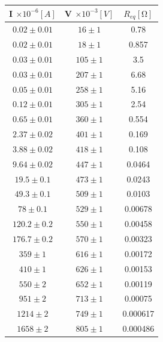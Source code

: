 \documentclass[a4paper]{article}
\begin{document}
\begin{center}
\begin{tabular}{|c|c|c|}
\hline
I $\times 10^{-6}[A]$ & V $\times 10^{-3}[V]$ & $R_{eq} [\si{\ohm}]$\\
\hline
$0.02 \pm 0.01$ & $16 \pm 1$ & 0.78 \\
$0.02 \pm 0.01$ & $18 \pm 1$ & 0.857 \\
$0.03 \pm 0.01$ & $105 \pm 1$ & 3.5 \\
$0.03 \pm 0.01$ & $207 \pm 1$ & 6.68 \\
$0.05 \pm 0.01$ & $258 \pm 1$ & 5.16 \\
$0.12 \pm 0.01$ & $305 \pm 1$ & 2.54 \\
$0.65 \pm 0.01$ & $360 \pm 1$ & 0.554 \\
$2.37 \pm 0.02$ & $401 \pm 1$ & 0.169 \\
$3.88 \pm 0.02$ & $418 \pm 1$ & 0.108 \\
$9.64 \pm 0.02$ & $447 \pm 1$ & 0.0464 \\
$19.5 \pm 0.1$ & $473 \pm 1$ & 0.0243 \\
$49.3 \pm 0.1$ & $509 \pm 1$ & 0.0103 \\
$78 \pm 0.1$ & $529 \pm 1$ & 0.00678 \\
$120.2 \pm 0.2$ & $550 \pm 1$ & 0.00458 \\
$176.7 \pm 0.2$ & $570 \pm 1$ & 0.00323 \\
$359 \pm 1$ & $616 \pm 1$ & 0.00172 \\
$410 \pm 1$ & $626 \pm 1$ & 0.00153 \\
$550 \pm 2$ & $652 \pm 1$ & 0.00119 \\
$951 \pm 2$ & $713 \pm 1$ & 0.00075 \\
$1214 \pm 2$ & $749 \pm 1$ & 0.000617 \\
$1658 \pm 2$ & $805 \pm 1$ & 0.000486 \\
\hline
\end{tabular}
\end{center}
\end{document}
